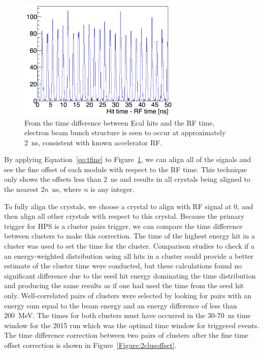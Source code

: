 \begin{figure}[H]
  \centering
      \includegraphics[width=0.7\textwidth]{pics/performance/beamStructure.png}
  \caption[Time difference between Ecal hits and RF time]{From the time difference between Ecal hits and the RF time, electron beam bunch structure is seen to occur at approximately 2~ns, consistent with known accelerator RF.}
  \label{Figure:beamBunch}
\end{figure}

By applying Equation~\eqref{eq:tfine} to Figure~\ref{Figure:beamBunch}, we can align all of the signals and see the fine offset of each module with respect to the RF time. This technique only shows the offsets less than 2~ns and results in all crystals being aligned to the nearest 2$n$~ns, where $n$ is any integer. 


To fully align the crystals, we choose a crystal to align with RF signal at 0, and then align all other crystals with respect to this crystal. Because the primary trigger for HPS is a cluster pairs trigger, we can compare the time difference between clusters to make this correction. The time of the highest energy hit in a cluster was used to set the time for the cluster. Comparison studies to check if a an energy-weighted distribution using all hits in a cluster could provide a better estimate of the cluster time were conducted, but these calculations found no significant difference due to the seed hit energy dominating the time distribution and producing the same results as if one had used the time from the seed hit only. Well-correlated pairs of clusters were selected by looking for pairs with an energy sum equal to the beam energy and an energy difference of less than 200~MeV. The times for both clusters must have occurred in the 30-70~ns time window for the 2015 run which was the optimal time window for triggered events. The time difference correction between two pairs of clusters after the fine time offset correction is shown in Figure~\ref{Figure:2clusoffset}.


